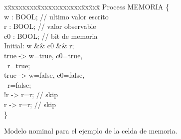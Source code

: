 \begin{figure}[t]
\centering
\begin{minipage}[t]{.47\textwidth}
\fontsize{10}{10}\selectfont\ttfamily
\begin{tabbing}
x\=xxxxxxxx\=xxxxxxxxxxxx\=xx\=xxx\= \kill    
Process MEMORIA \{\\[1ex]
\>w : BOOL; // ultimo valor escrito \\
\>r : BOOL;  // valor observable \\ 
\>c0 : BOOL; // bit de memoria\\[1ex]
\>Initial: w \&\& c0 \&\& r;\\[1ex]
\>[write1]  true -> w=true, c0=true, \\
\>\>~r=true; \\
\>[write0]  true -> w=false, c0=false, \\
\>\>~r=false; \\
\>[read0] !r -> r=r; // skip \\
\>[read1]  r -> r=r; // skip \\[1ex]
\}\\
\end{tabbing}
\end{minipage}
\caption{Modelo nominal para el ejemplo de la celda de memoria.} \label{fig:exam_1_mem_cell_nominal}
\end{figure}

\hfill

